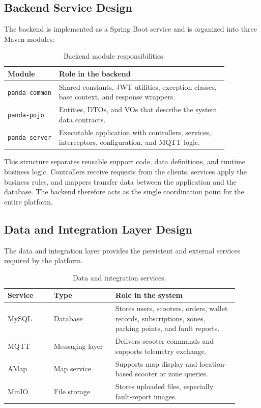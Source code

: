 \documentclass[12pt,a4paper]{article}
\begin{document}
\subsection{Backend Service Design}

The backend is implemented as a Spring Boot service and is organized into three Maven modules:

\begin{table}[H]
\centering
\begin{tabular}{p{0.20\linewidth} p{0.66\linewidth}}
\toprule
\textbf{Module} & \textbf{Role in the backend} \\
\midrule
\texttt{panda-common} & Shared constants, JWT utilities, exception classes, base context, and response wrappers. \\
\texttt{panda-pojo} & Entities, DTOs, and VOs that describe the system data contracts. \\
\texttt{panda-server} & Executable application with controllers, services, interceptors, configuration, and MQTT logic. \\
\bottomrule
\end{tabular}
\caption{Backend module responsibilities.}
\end{table}

This structure separates reusable support code, data definitions, and runtime business logic. Controllers receive requests from the clients, services apply the business rules, and mappers transfer data between the application and the database. The backend therefore acts as the single coordination point for the entire platform.

\subsection{Data and Integration Layer Design}

The data and integration layer provides the persistent and external services required by the platform.

\begin{table}[H]
\centering
\begin{tabular}{p{0.18\linewidth} p{0.24\linewidth} p{0.48\linewidth}}
\toprule
\textbf{Service} & \textbf{Type} & \textbf{Role in the system} \\
\midrule
MySQL & Database & Stores users, scooters, orders, wallet records, subscriptions, zones, parking points, and fault reports. \\
MQTT & Messaging layer & Delivers scooter commands and supports telemetry exchange. \\
AMap & Map service & Supports map display and location-based scooter or zone queries. \\
MinIO & File storage & Stores uploaded files, especially fault-report images. \\
\bottomrule
\end{tabular}
\caption{Data and integration services.}
\end{table}
\end{document}
